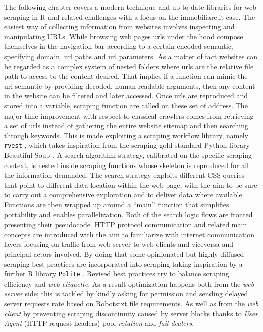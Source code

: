 \documentclass[
  12pt,
  a4paper,
  oneside]{book}
\newcommand{\passthrough}[1]{#1}
\theoremstyle{definition}
\theoremstyle{definition}
\theoremstyle{definition}
\theoremstyle{remark}
\begin{document}
The following chapter covers a modern technique and up-to-date libraries for web scraping in R and related challenges with a focus on the immobiliare.it case. The easiest way of collecting information from websites involves inspecting and manipulating URLs. While browsing web pages urls under the hood compose themselves in the navigation bar according to a certain encoded semantic, specifying domain, url paths and url parameters. As a matter of fact websites can be regarded as a complex system of nested folders where urls are the relative file path to access to the content desired. That implies if a function can mimic the url semantic by providing decoded, human-readable arguments, then any content in the website can be filtered and later accessed.
Once urls are reproduced and stored into a variable, scraping function are called on these set of address.
The major time improvement with respect to classical crawlers comes from retrieving a set of urls instead of gathering the entire website sitemap and then searching through keywords.
This is made exploiting a scraping workflow library, namely \passthrough{\lstinline!rvest!} \citet{rvest}, which takes inspiration from the scraping gold standard Python library Beautiful Soup \citet{Beautifulsoup}. A search algorithm strategy, calibrated on the specific scraping context, is nested inside scraping functions whose skeleton is reproduced for all the information demanded. The search strategy exploits different CSS queries that point to different data location within the web page, with the aim to be sure to carry out a comprehensive exploration and to deliver data where available. Functions are then wrapped up around a ``main'' function that simplifies portability and enables parallelization. Both of the search logic flows are fronted presenting their pseudocode.
HTTP protocol communication and related main concepts are introduced with the aim to familiarize with internet communication layers focusing on traffic from web server to web clients and viceversa and principal actors involved.
By doing that some opinionated but highly diffused scraping best practices are incorporated into scraping taking inspiration by a further R library \passthrough{\lstinline!Polite!} \citet{polite}. Revised best practices try to balance scraping efficiency and \emph{web etiquette}. As a result optimization happens both from the \emph{web server} side; this is tackled by kindly asking for permission and sending delayed server requests rate based on Robotstxt file requirements. As well as from the \emph{web client} by preventing scraping discontinuity caused by server blocks thanks to \emph{User Agent} (HTTP request headers) pool \emph{rotation} and \emph{fail dealers}.
\end{document}
